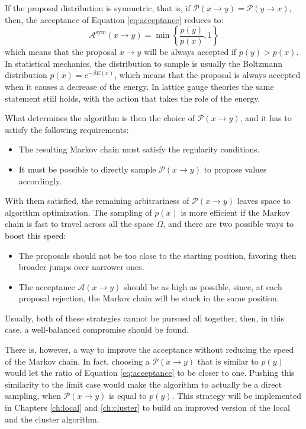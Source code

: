 If the proposal distribution is symmetric, that is, if $\mathcal P(x\to y) = \mathcal P(y\to x)$,
then, the acceptance of Equation \eqref{eq:acceptance} reduces to:
\begin{equation}\label{eq:acceptance_sym}
    \mathcal A^\mathrm{sym}(x\to y) = \min\left\{\frac{p(y)}{p(x)},1\right\}
\end{equation}
which means that the proposal $x\to y$ will be always accepted if $p(y) > p(x)$.
In statistical mechanics, the distribution to sample is usually the Boltzmann distribution $p(x) = e^{-\beta E(x)}$,
which means that the proposal is always accepted when it causes a decrease of the energy.
In lattice gauge theories the same statement still holds, with the action that takes the role of the energy.

What determines the algorithm is then the choice of $\mathcal P(x\to y)$,
and it has to satisfy the following requirements:
\begin{itemize}
    \item The resulting Markov chain must satisfy the regularity conditions.
    \item It must be possible to directly sample $\mathcal P(x\to y)$ to propose values accordingly.
\end{itemize}

With them satisfied, the remaining arbitrariness of $\mathcal P(x\to y)$ leaves space to algorithm optimization.
The sampling of $p(x)$ is more efficient if the Markov chain is fast to travel across all the space $\Omega$,
and there are two possible ways to boost this speed:
\begin{itemize}
    \item The proposals should not be too close to the starting position, favoring then broader jumps over narrower ones.
    \item The acceptance $\mathcal A(x\to y)$ should be as high as possible, since, at each proposal rejection,
        the Markov chain will be stuck in the same position.
\end{itemize}
Usually, both of these strategies cannot be pursued all together, then, in this case, a well-balanced compromise should be found.

There is, however, a way to improve the acceptance without reducing the speed of the Markov chain.
In fact, choosing a $\mathcal P(x\to y)$ that is similar to $p(y)$ would let the ratio of Equation \eqref{eq:acceptance} to be closer to one.
Pushing this similarity to the limit case would make the algorithm to actually be a direct sampling, when $\mathcal P(x\to y)$ is equal to $p(y)$.
This strategy will be implemented in Chapters \ref{ch:local} and \ref{ch:cluster} to build an improved version of the local and the cluster algorithm.

